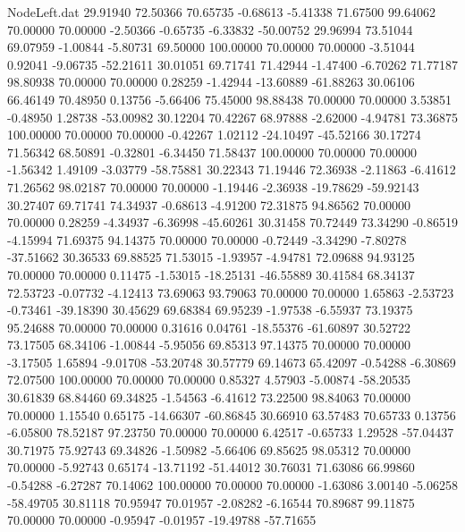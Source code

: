 \begin{filecontents}{NodeLeft.dat}
  29.91940   72.50366   70.65735    -0.68613   -5.41338   71.67500   99.64062   70.00000   70.00000   -2.50366   -0.65735   -6.33832  -50.00752
  29.96994   73.51044   69.07959    -1.00844   -5.80731   69.50000  100.00000   70.00000   70.00000   -3.51044    0.92041   -9.06735  -52.21611
  30.01051   69.71741   71.42944    -1.47400   -6.70262   71.77187   98.80938   70.00000   70.00000    0.28259   -1.42944  -13.60889  -61.88263
  30.06106   66.46149   70.48950     0.13756   -5.66406   75.45000   98.88438   70.00000   70.00000    3.53851   -0.48950    1.28738  -53.00982
  30.12204   70.42267   68.97888    -2.62000   -4.94781   73.36875  100.00000   70.00000   70.00000   -0.42267    1.02112  -24.10497  -45.52166
  30.17274   71.56342   68.50891    -0.32801   -6.34450   71.58437  100.00000   70.00000   70.00000   -1.56342    1.49109   -3.03779  -58.75881
  30.22343   71.19446   72.36938    -2.11863   -6.41612   71.26562   98.02187   70.00000   70.00000   -1.19446   -2.36938  -19.78629  -59.92143
  30.27407   69.71741   74.34937    -0.68613   -4.91200   72.31875   94.86562   70.00000   70.00000    0.28259   -4.34937   -6.36998  -45.60261
  30.31458   70.72449   73.34290    -0.86519   -4.15994   71.69375   94.14375   70.00000   70.00000   -0.72449   -3.34290   -7.80278  -37.51662
  30.36533   69.88525   71.53015    -1.93957   -4.94781   72.09688   94.93125   70.00000   70.00000    0.11475   -1.53015  -18.25131  -46.55889
  30.41584   68.34137   72.53723    -0.07732   -4.12413   73.69063   93.79063   70.00000   70.00000    1.65863   -2.53723   -0.73461  -39.18390
  30.45629   69.68384   69.95239    -1.97538   -6.55937   73.19375   95.24688   70.00000   70.00000    0.31616    0.04761  -18.55376  -61.60897
  30.52722   73.17505   68.34106    -1.00844   -5.95056   69.85313   97.14375   70.00000   70.00000   -3.17505    1.65894   -9.01708  -53.20748
  30.57779   69.14673   65.42097    -0.54288   -6.30869   72.07500  100.00000   70.00000   70.00000    0.85327    4.57903   -5.00874  -58.20535
  30.61839   68.84460   69.34825    -1.54563   -6.41612   73.22500   98.84063   70.00000   70.00000    1.15540    0.65175  -14.66307  -60.86845
  30.66910   63.57483   70.65733     0.13756   -6.05800   78.52187   97.23750   70.00000   70.00000    6.42517   -0.65733    1.29528  -57.04437
  30.71975   75.92743   69.34826    -1.50982   -5.66406   69.85625   98.05312   70.00000   70.00000   -5.92743    0.65174  -13.71192  -51.44012
  30.76031   71.63086   66.99860    -0.54288   -6.27287   70.14062  100.00000   70.00000   70.00000   -1.63086    3.00140   -5.06258  -58.49705
  30.81118   70.95947   70.01957    -2.08282   -6.16544   70.89687   99.11875   70.00000   70.00000   -0.95947   -0.01957  -19.49788  -57.71655

\end{filecontents}
